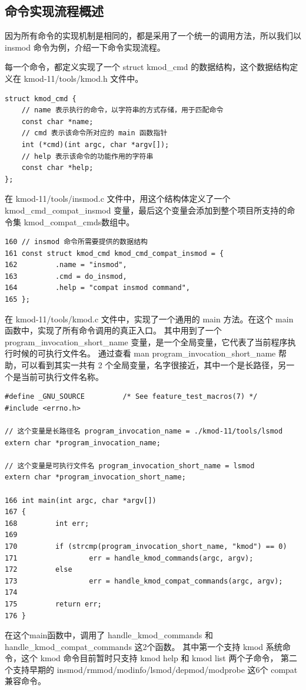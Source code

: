 \subsection{命令实现流程概述}

因为所有命令的实现机制是相同的，都是采用了一个统一的调用方法，所以我们以
insmod 命令为例，介绍一下命令实现流程。

每一个命令，都定义实现了一个 struct kmod\_cmd
的数据结构，这个数据结构定义在 kmod-11/tools/kmod.h 文件中。

{\begin{shaded}\begin{verbatim}
struct kmod_cmd {
    // name 表示执行的命令，以字符串的方式存储，用于匹配命令
    const char *name;
    // cmd 表示该命令所对应的 main 函数指针
    int (*cmd)(int argc, char *argv[]);
    // help 表示该命令的功能作用的字符串
    const char *help;
};
\end{verbatim}\end{shaded}}
在 kmod-11/tools/insmod.c 文件中，用这个结构体定义了一个
kmod\_cmd\_compat\_insmod
变量，最后这个变量会添加到整个项目所支持的命令集
kmod\_compat\_cmds数组中。

{\begin{shaded}\begin{verbatim}
160 // insmod 命令所需要提供的数据结构
161 const struct kmod_cmd kmod_cmd_compat_insmod = {
162         .name = "insmod",
163         .cmd = do_insmod,
164         .help = "compat insmod command",
165 };
\end{verbatim}\end{shaded}}
在 kmod-11/tools/kmod.c 文件中，实现了一个通用的 main 方法。在这个 main
函数中，实现了所有命令调用的真正入口。 其中用到了一个
program\_invocation\_short\_name
变量，是一个全局变量，它代表了当前程序执行时候的可执行文件名。 通过查看
man program\_invocation\_short\_name 帮助，可以看到其实一共有 2
个全局变量，名字很接近，其中一个是长路径，另一个是当前可执行文件名称。

{\begin{shaded}\begin{verbatim}
#define _GNU_SOURCE         /* See feature_test_macros(7) */
#include <errno.h>

// 这个变量是长路径名 program_invocation_name = ./kmod-11/tools/lsmod
extern char *program_invocation_name;

// 这个变量是可执行文件名 program_invocation_short_name = lsmod
extern char *program_invocation_short_name;

166 int main(int argc, char *argv[])
167 {
168         int err;
169 
170         if (strcmp(program_invocation_short_name, "kmod") == 0)
171                 err = handle_kmod_commands(argc, argv);
172         else
173                 err = handle_kmod_compat_commands(argc, argv);
174 
175         return err;
176 }
\end{verbatim}\end{shaded}}
在这个main函数中，调用了 handle\_kmod\_commands 和
handle\_kmod\_compat\_commands 这2个函数。 其中第一个支持 kmod
系统命令，这个 kmod 命令目前暂时只支持 kmod help 和 kmod list 两个子命令，
第二个支持早期的 insmod/rmmod/modinfo/lsmod/depmod/modprobe 这6个 compat
兼容命令。

